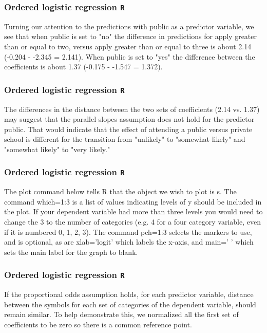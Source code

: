 \documentclass[00-GLMregslides.tex]{subfiles}
\begin{document}
\begin{frame}[fragile]
	\frametitle{Ordered logistic regression \texttt{R} }
	\Large
	Turning our attention to the predictions with public as a predictor variable, we see that when public is set to "no" the difference in predictions for apply greater than or equal to two, versus apply greater than or equal to three is about 2.14 (-0.204 - -2.345 = 2.141). When public is set to "yes" the difference between the coefficients is about 1.37 (-0.175 - -1.547 = 1.372).
\end{frame}

\begin{frame}[fragile]
	\frametitle{Ordered logistic regression \texttt{R} }
	\Large
	The differences in the distance between the two sets of coefficients (2.14 vs. 1.37) may suggest that the parallel slopes assumption does not hold for the predictor public. That would indicate that the effect of attending a public versus private school is different for the transition from "unlikely" to "somewhat likely" and "somewhat likely" to "very likely."
\end{frame}
\begin{frame}[fragile]
	\frametitle{Ordered logistic regression \texttt{R} }
	\Large
	The plot command below tells R that the object we wish to plot is s. The command which=1:3 is a list of values indicating levels of y should be included in the plot. If your dependent variable had more than three levels you would need to change the 3 to the number of categories (e.g. 4 for a four category variable, even if it is numbered 0, 1, 2, 3). The command pch=1:3 selects the markers to use, and is optional, as are xlab='logit' which labels the x-axis, and main=' ' which sets the main label for the graph to blank. 
\end{frame}

\begin{frame}[fragile]
	\frametitle{Ordered logistic regression \texttt{R} }
	\Large
	If the proportional odds assumption holds, for each predictor variable, distance between the symbols for each set of categories of the dependent variable, should remain similar. To help demonstrate this, we normalized all the first set of coefficients to be zero so there is a common reference point.
	
\end{frame}
\end{document}
